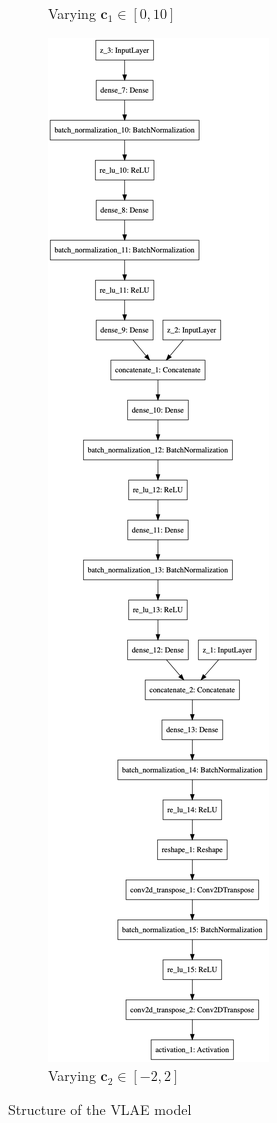 \begin{figure}
\begin{subfigure}{.45\textwidth}
        \caption{Varying $\bm{c}_1 \in [0, 10]$}
    \end{subfigure}%
    \begin{subfigure}{.45\textwidth}
        \centering
        \includegraphics[height=.8\textheight]{images/vlae_decoder.png}
        \caption{Varying $\bm{c}_2 \in [-2, 2]$}
    \end{subfigure}
    \caption[\ac{VLAE} structure]{Structure of the \ac{VLAE} model}
    \label{fig:vlae_structure}
\end{figure}

